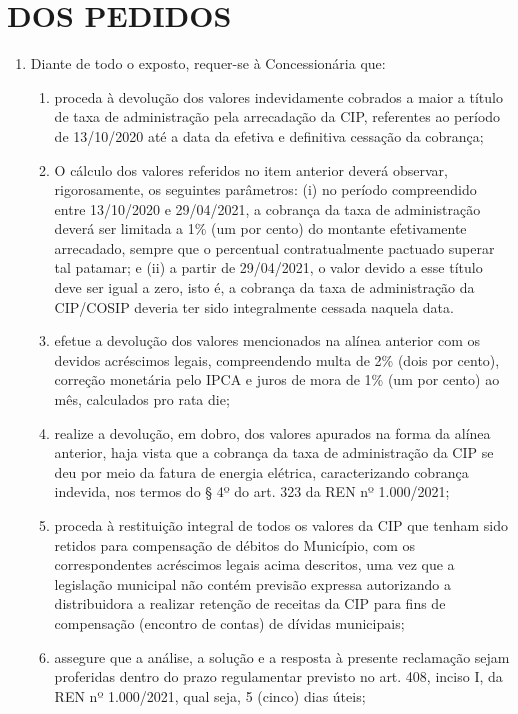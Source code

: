 \section{DOS PEDIDOS}

\begin{enumerate}[resume]

\item Diante de todo o exposto, requer-se à Concessionária que:

    \begin{enumerate}
        \item proceda à devolução dos valores indevidamente cobrados a maior a título de taxa de administração pela arrecadação da CIP, referentes ao período de 13/10/2020 até a data da efetiva e definitiva cessação da cobrança;
        \item O cálculo dos valores referidos no item anterior deverá observar, rigorosamente, os seguintes parâmetros: (i) no período compreendido entre 13/10/2020 e 29/04/2021, a cobrança da taxa de administração deverá ser limitada a 1\% (um por cento) do montante efetivamente arrecadado, sempre que o percentual contratualmente pactuado superar tal patamar; e (ii) a partir de 29/04/2021, o valor devido a esse título deve ser igual a zero, isto é, a cobrança da taxa de administração da CIP/COSIP deveria ter sido integralmente cessada naquela data.
        \item efetue a devolução dos valores mencionados na alínea anterior com os devidos acréscimos legais, compreendendo multa de 2\% (dois por cento), correção monetária pelo IPCA e juros de mora de 1\% (um por cento) ao mês, calculados pro rata die;
        \item realize a devolução, em dobro, dos valores apurados na forma da alínea anterior, haja vista que a cobrança da taxa de administração da CIP se deu por meio da fatura de energia elétrica, caracterizando cobrança indevida, nos termos do § 4º do art. 323 da REN nº 1.000/2021;
        \item proceda à restituição integral de todos os valores da CIP que tenham sido retidos para compensação de débitos do Município, com os correspondentes acréscimos legais acima descritos, uma vez que a legislação municipal não contém previsão expressa autorizando a distribuidora a realizar retenção de receitas da CIP para fins de compensação (encontro de contas) de dívidas municipais;
        \item assegure que a análise, a solução e a resposta à presente reclamação sejam proferidas dentro do prazo regulamentar previsto no art. 408, inciso I, da REN nº 1.000/2021, qual seja, 5 (cinco) dias úteis;

\end{enumerate}
\end{enumerate}
